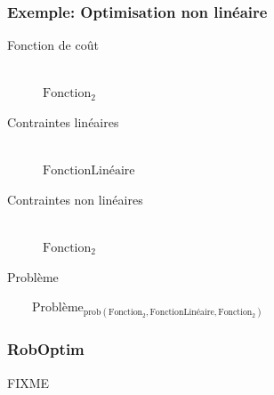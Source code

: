 \documentclass[14pt,utf8x,hyperref={pdfpagelabels=false}]{beamer}
\begin{document}
\begin{slideDecision}
  \begin{changeleftmargin}{1.1cm}
    \frametitle{Exemple: Optimisation non linéaire}

    \begin{description}
    \item[Fonction de coût]~\\
      $\text{Fonction}_2$
    \item[Contraintes linéaires]~\\
      $\text{FonctionLinéaire}$
    \item[Contraintes non linéaires]~\\
      $\text{Fonction}_2$
    \item[Problème]
    \end{description}

    ~~~~$\text{Problème}_{\text{prob}(\text{Fonction}_2, \text{FonctionLinéaire}, \text{Fonction}_2)}$

  \end{changeleftmargin}
\end{slideDecision}


\begin{slideDecision}
  \frametitle{RobOptim}

  FIXME
\end{slideDecision}
\end{document}

